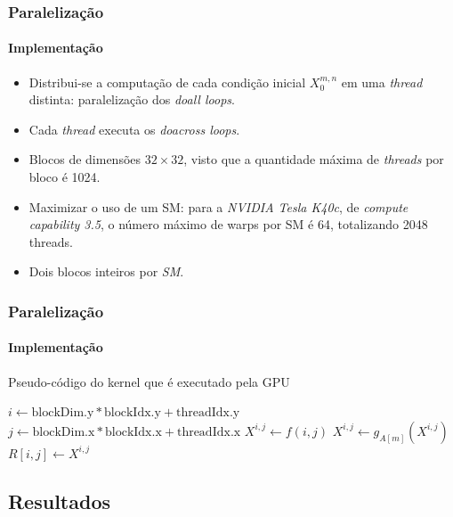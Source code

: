 \documentclass[10pt]{beamer}
\begin{document}
\begin{frame}
\frametitle{Paralelização}
\framesubtitle{Implementação}
\begin{itemize}
  \item Distribui-se a computação de cada condição inicial \(X_0^{m,n}\) em uma
  \textit{thread} distinta: paralelização dos \textit{doall loops}.
  \item Cada \textit{thread} executa os \textit{doacross loops}.
  \item  Blocos de dimensões \(32\times32\), visto que a quantidade máxima
  de \textit{threads} por bloco é 1024.
  \item Maximizar o uso de um SM: para a \textit{NVIDIA Tesla K40c}, de
  \textit{compute capability 3.5}, o número máximo de warps por SM é 64,
  totalizando 2048 threads.
  \item Dois blocos inteiros por \textit{SM}.
\end{itemize}

\end{frame}

\begin{frame}
\frametitle{Paralelização}
\framesubtitle{Implementação}

\begin{algorithm}[H]
\caption{Pseudo-código do kernel que é executado pela GPU} 
\begin{algorithmic}[1]
  	\State ${i} \gets \text{blockDim.y} * \text{blockIdx.y} + \text{threadIdx.y} $  
  	\State ${j} \gets \text{blockDim.x} * \text{blockIdx.x} + \text{threadIdx.x} $   
    \State ${X^{i,j}} \gets f(i,j) $ 
     
         
        	\State $X^{i,j} \gets g_{A[m]} (X^{i,j})$ 
    	\EndFor
    \EndFor
    \State ${R[i,j]} \gets X^{i,j} $ 
   \EndFunction
\end{algorithmic}
\end{algorithm}

\end{frame}

\subsection{Resultados}
\end{document}
